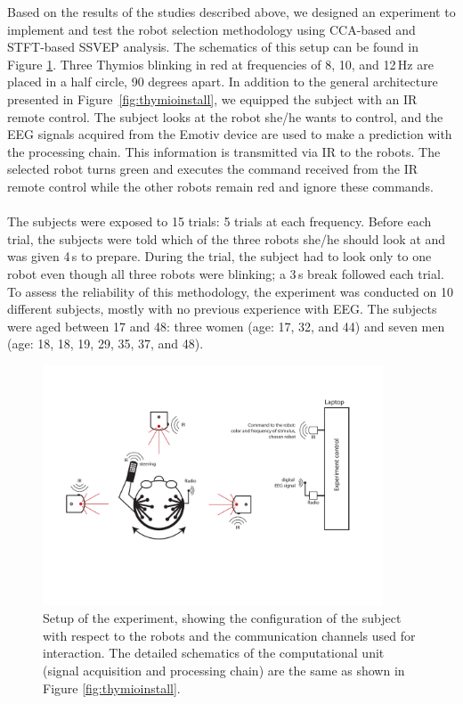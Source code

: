 \documentclass[smallextended]{svjour3}
\begin{document}
Based on the results of the studies described above, we designed an experiment to implement and test the robot selection methodology using CCA-based and STFT-based SSVEP analysis. The schematics of this setup can be found in Figure \ref{fig:experiment-set-up}. 
Three Thymios blinking in red at frequencies of 8, 10, and 12\,Hz are placed in a half circle, 90 degrees apart.
In addition to the general architecture presented in Figure~\ref{fig:thymioinstall}, we equipped the subject with an IR remote control.
The subject looks at the robot she/he wants to control, and the EEG signals acquired from the Emotiv device are used to make a prediction with the processing chain.
This information is transmitted via IR to the robots.
The selected robot turns green and executes the command received from the IR remote control while the other robots remain red and ignore these commands.\\
\\
The subjects were exposed to 15 trials: 5 trials at each frequency. Before each trial, the subjects were told which of the three robots she/he should look at and was given 4\,s to prepare. During the trial, the subject had to look only to one robot even though all three robots were blinking; a 3\,s break followed each trial.
To assess the reliability of this methodology, the experiment was conducted on 10 different subjects, mostly with no previous experience with EEG.
The subjects were aged between 17 and 48: three women (age: 17, 32, and 44) and seven men (age: 18, 18, 19, 29, 35, 37, and 48). 

\begin{figure}
\center
\includegraphics[width=0.9\textwidth]{figures/schema-global2.pdf}
    \caption{Setup of the experiment, showing the configuration of the subject with respect to the robots and the communication channels used for interaction. The detailed schematics of the computational unit (signal acquisition and processing chain) are the same as shown in Figure \ref{fig:thymioinstall}.} \label{fig:experiment-set-up}
\end{figure}
\end{document}
